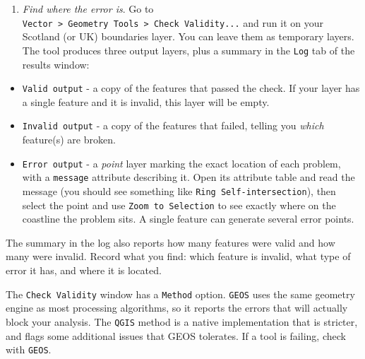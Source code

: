 \documentclass[
  letterpaper,
  DIV=11,
  numbers=noendperiod]{scrreprt}
\providecommand{\tightlist}{%
  \setlength{\itemsep}{0pt}\setlength{\parskip}{0pt}}\usepackage{longtable,booktabs,array}
\begin{document}
\begin{enumerate}
\def\labelenumi{\alph{enumi})}
\tightlist
\item
  \emph{Find where the error is}. Go to
  \texttt{Vector\ \textgreater{}\ Geometry\ Tools\ \textgreater{}\ Check\ Validity...}
  and run it on your Scotland (or UK) boundaries layer. You can leave
  them as temporary layers. The tool produces three output layers, plus
  a summary in the \texttt{Log} tab of the results window:
\end{enumerate}

\begin{itemize}
\tightlist
\item
  \texttt{Valid\ output} - a copy of the features that passed the check.
  If your layer has a single feature and it is invalid, this layer will
  be empty.
\item
  \texttt{Invalid\ output} - a copy of the features that failed, telling
  you \emph{which} feature(s) are broken.
\item
  \texttt{Error\ output} - a \emph{point} layer marking the exact
  location of each problem, with a \texttt{message} attribute describing
  it. Open its attribute table and read the message (you should see
  something like \texttt{Ring\ Self-intersection}), then select the
  point and use \texttt{Zoom\ to\ Selection} to see exactly where on the
  coastline the problem sits. A single feature can generate several
  error points.
\end{itemize}

The summary in the log also reports how many features were valid and how
many were invalid. Record what you find: which feature is invalid, what
type of error it has, and where it is located.

\begin{tcolorbox}[enhanced jigsaw, breakable, toptitle=1mm, colback=white, left=2mm, leftrule=.75mm, titlerule=0mm, colframe=quarto-callout-note-color-frame, opacityback=0, title=\textcolor{quarto-callout-note-color}{\faInfo}\hspace{0.5em}{Why are there two validity methods?}, toprule=.15mm, opacitybacktitle=0.6, bottomtitle=1mm, colbacktitle=quarto-callout-note-color!10!white, bottomrule=.15mm, coltitle=black, rightrule=.15mm, arc=.35mm]

The \texttt{Check\ Validity} window has a \texttt{Method} option.
\texttt{GEOS} uses the same geometry engine as most processing
algorithms, so it reports the errors that will actually block your
analysis. The \texttt{QGIS} method is a native implementation that is
stricter, and flags some additional issues that GEOS tolerates. If a
tool is failing, check with \texttt{GEOS}.

\end{tcolorbox}
\end{document}
